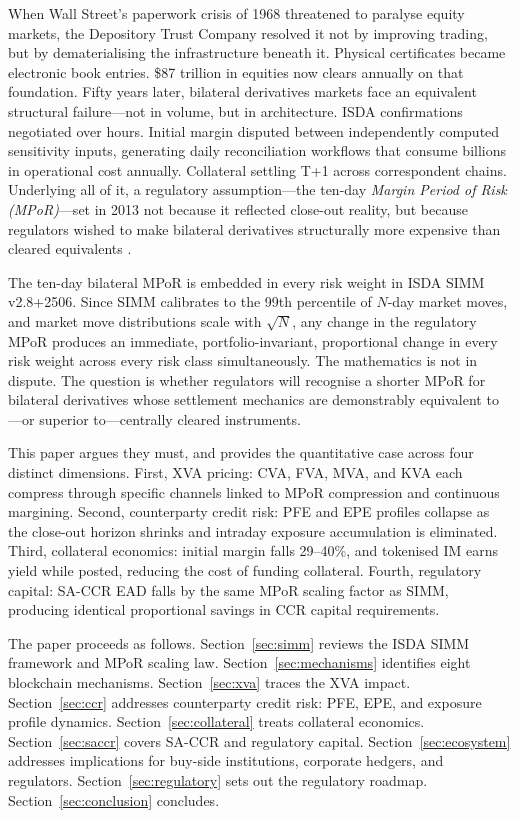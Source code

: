 \documentclass[12pt,letterpaper]{article}
\numberwithin{equation}{section}
\theoremstyle{remark}
\begin{document}
When Wall Street's paperwork crisis of 1968 threatened to paralyse equity
markets, the Depository Trust Company resolved it not by improving trading,
but by dematerialising the infrastructure beneath it. Physical certificates
became electronic book entries. \$87 trillion in equities now clears annually
on that foundation. Fifty years later, bilateral derivatives markets face an
equivalent structural failure---not in volume, but in architecture. ISDA
confirmations negotiated over hours. Initial margin disputed between
independently computed sensitivity inputs, generating daily reconciliation
workflows that consume billions in operational cost annually. Collateral
settling T+1 across correspondent chains. Underlying all of it, a regulatory
assumption---the ten-day \emph{Margin Period of Risk (MPoR)}---set in 2013
not because it reflected close-out reality, but because regulators wished to
make bilateral derivatives structurally more expensive than cleared equivalents
\citep{bcbs_iosco_2015}.

The ten-day bilateral MPoR is embedded in every risk weight in ISDA SIMM
v2.8+2506. Since SIMM calibrates to the 99th percentile of $N$-day market
moves, and market move distributions scale with $\sqrt{N}$, any change in
the regulatory MPoR produces an immediate, portfolio-invariant, proportional
change in every risk weight across every risk class simultaneously. The
mathematics is not in dispute. The question is whether regulators will
recognise a shorter MPoR for bilateral derivatives whose settlement mechanics
are demonstrably equivalent to---or superior to---centrally cleared
instruments.

This paper argues they must, and provides the quantitative case across four
distinct dimensions. First, XVA pricing: CVA, FVA, MVA, and KVA each
compress through specific channels linked to MPoR compression and continuous
margining. Second, counterparty credit risk: PFE and EPE profiles collapse
as the close-out horizon shrinks and intraday exposure accumulation is
eliminated. Third, collateral economics: initial margin falls 29--40\%, and
tokenised IM earns yield while posted, reducing the cost of funding
collateral. Fourth, regulatory capital: SA-CCR EAD falls by the same MPoR
scaling factor as SIMM, producing identical proportional savings in CCR
capital requirements.

The paper proceeds as follows. Section~\ref{sec:simm} reviews the ISDA SIMM
framework and MPoR scaling law. Section~\ref{sec:mechanisms} identifies eight
blockchain mechanisms. Section~\ref{sec:xva} traces the XVA impact.
Section~\ref{sec:ccr} addresses counterparty credit risk: PFE, EPE, and
exposure profile dynamics. Section~\ref{sec:collateral} treats collateral
economics. Section~\ref{sec:saccr} covers SA-CCR and regulatory capital.
Section~\ref{sec:ecosystem} addresses implications for buy-side institutions,
corporate hedgers, and regulators. Section~\ref{sec:regulatory} sets out the
regulatory roadmap. Section~\ref{sec:conclusion} concludes.
\end{document}
